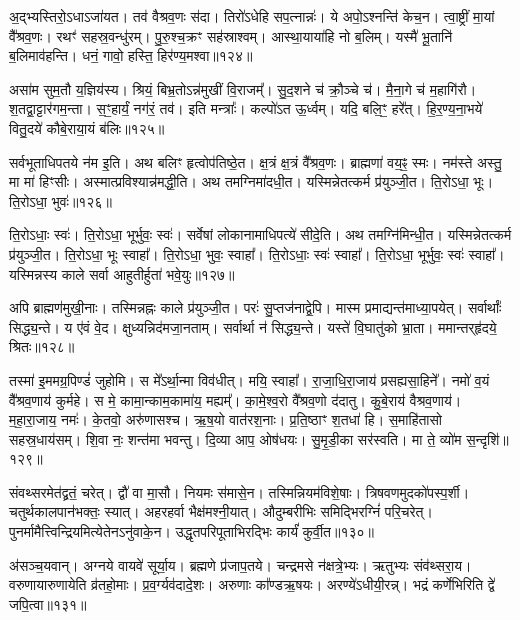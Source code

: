 अ॒द्भ्यस्तिरो॒ऽधाऽजा॑यत। तव॑ वैश्रव॒णः स॑दा। 
तिरो॑ऽधेहि सप॒त्नान्नः॑। ये अपो॒ऽश्नन्ति॑ केच॒न। 
त्वा॒ष्ट्रीं मा॒यां वै᳚श्रव॒णः। रथꣳ॑ सहस्र॒वन्धु॑रम्। 
पु॒रु॒श्च॒क्रꣳ सह॑स्राश्वम्। आस्था॒याया॑हि नो ब॒लिम्। 
यस्मै॑ भू॒तानि॑ ब॒लिमाव॑हन्ति। धनं॒ गावो॒ हस्ति॒ हिर॑ण्य॒मश्वा\sn{}॥१२४॥


असा॑म सुम॒तौ य॒ज्ञिय॑स्य। श्रियं॒ बिभ्र॒तोऽन्न॑मुखीं वि॒राजम्‌᳚। 
सु॒द॒\ar{}शने च॑ क्रौ॒ञ्चे च॑। मै॒ना॒गे च॑ म॒हागि॑रौ। 
श॒तद्वा॒ट्टार॑गम॒न्ता। स॒ꣳ॒हार्यं॒ नग॑रं॒ तव॑। 
इति मन्त्राः᳚। कल्पो॑ऽत ऊ॒र्ध्वम्। यदि॒ बलि॒ꣳ॒ हरे᳚त्। 
हि॒र॒ण्य॒ना॒भये॑ वितु॒दये॑ कौबे॒राया॒यं ब॑लिः॥१२५॥


सर्वभूताधिपतये न॑म इ॒ति। अथ बलिꣳ हृत्वोप॑तिष्ठे॒त। 
क्ष॒त्रं क्ष॒त्रं वै᳚श्रव॒णः। ब्राह्मणा॑ वय॒ꣴ॒ स्मः। 
नम॑स्ते अस्तु॒ मा मा॑ हिꣳसीः। अस्मात्प्रविश्यान्न॑मद्धी॒ति। 
अथ तमग्निमा॑दधी॒त। यस्मिन्नेतत्कर्म प्र॑युञ्जी॒त। 
ति॒रोऽधा॒ भूः। ति॒रोऽधा॒ भुवः॑॥१२६॥


ति॒रोऽधाः॒ स्वः॑। ति॒रोऽधा॒ भूर्भुवः॒ स्वः॑। 
सर्वेषां लोकानामाधिपत्ये॑ सीदे॒ति। अथ तमग्नि॑मिन्धी॒त। 
यस्मिन्नेतत्कर्म प्र॑युञ्जी॒त। ति॒रोऽधा॒ भूः स्वाहा᳚। 
ति॒रोऽधा॒ भुवः॒ स्वाहा᳚। ति॒रोऽधाः॒ स्वः॑ स्वाहा᳚। 
ति॒रोऽधा॒ भूर्भुवः॒ स्वः॑ स्वाहा᳚। 
यस्मिन्नस्य काले सर्वा आहुतीर्\mbox{}हुता॑ भवे॒युः॥१२७॥


अपि ब्राह्मण॑मुखी॒नाः। तस्मिन्नह्नः काले प्र॑युञ्जी॒त। 
परः॑ सु॒प्तज॑नाद्वे॒पि। मास्म प्रमाद्यन्त॑माध्या॒पयेत्। 
सर्वार्थाः᳚ सिद्ध्य॒न्ते। य ए॑वं वे॒द। 
क्षुध्यन्निद॑मजा॒नताम्। सर्वार्था न॑ सिद्ध्य॒न्ते। 
यस्ते॑ वि॒घातु॑को भ्रा॒ता। ममान्तर्‌हृ॑दये॒ श्रितः॥१२८॥


तस्मा॑ इ॒ममग्र॒पिण्डं॑ जुहोमि। स मे᳚ऽर्था॒न्मा विव॑धीत्। 
मयि॒ स्वाहा᳚। रा॒जा॒धि॒रा॒जाय॑ प्रसह्यसा॒हिने᳚। 
नमो॑ व॒यं वै᳚श्रव॒णाय॑ कुर्महे। स मे॒ कामा॒न्काम॒कामा॑य॒ मह्यम्‌᳚। 
का॒मे॒श्व॒रो वै᳚श्रव॒णो द॑दातु। कु॒बे॒राय॑ वैश्रव॒णाय॑। 
म॒हा॒रा॒जाय॒ नमः॑। के॒तवो॒ अरु॑णासश्च। 
ऋ॒ष॒यो वात॑रश॒नाः। प्र॒ति॒ष्ठाꣳ श॒तधा॑ हि। 
स॒माहि॑तासो सहस्र॒धाय॑सम्। शि॒वा नः॒ शन्त॑मा भवन्तु। 
दि॒व्या आप॒ ओष॑धयः। सु॒मृ॒डी॒का सर॑स्वति। 
मा ते॒ व्यो॑म स॒न्दृशि॑॥१२९॥\anuvakamend


संवथ्सरमेत॑द्व्रतं॒ चरेत्। द्वौ॑ वा मा॒सौ। 
नियमः स॑मासे॒न। तस्मिन्नियम॑विशे॒षाः। 
त्रिषवणमुदको॑पस्प॒र्शी। चतुर्थकालपान॑भक्तः॒ स्यात्। 
अहरहर्वा भैक्ष॑मश्नी॒यात्। औदुम्बरीभिः समिद्भिरग्निं॑ परि॒चरेत्। 
पुनर्मामैत्त्विन्द्रियमि\-त्येतेनऽनु॑वाके॒न। उद्धृतपरिपूताभि\-रद्भिः कार्यं॑ कुर्वी॒त॥१३०॥


अ॑सञ्च॒यवान्। अग्नये वायवे॑ सूर्या॒य। 
ब्रह्मणे प्र॑जाप॒तये। चन्द्रमसे न॑क्षत्रे॒भ्यः। 
ऋतुभ्यः संव॑थ्सरा॒य। वरुणायारुणायेति व्र॑तहो॒माः। 
प्र॒व॒र्ग्यव॑दादे॒शः। अरुणाः का᳚ण्डऋ॒षयः। 
अरण्ये॑ऽधीयी॒रन्न्। भद्रं कर्णेभिरिति द्वे॑ जपि॒त्वा॥१३१॥


